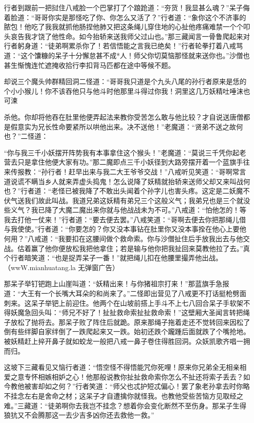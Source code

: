 \documentclass[12pt,UTF8]{ctexbook}
\begin{document}
行者到跟前一把挝住八戒脸一个巴掌打了个踉跄道：“夯货！我显甚么魂？”呆子侮着脸道：“哥哥你实是那怪吃了你、你怎么又活了？”行者道：“象你这个不济事的脓包！他吃了我我就抓他肠捏他肺又把这条绳儿穿住地的心扯他疼痛难禁一个个叩头哀告我才饶了他性命。如今抬轿来送我师父过山也。”那三藏闻言一骨鲁爬起来对行者躬身道：“徒弟啊累杀你了！若信悟能之言我已绝矣！”行者轮拳打着八戒骂道：“这个馕糠的呆子十分懈怠甚不成*人！师父你切莫恼那怪就来送你也。”沙僧也甚生惭愧连忙遮掩收拾行李扣背马匹都在途中等候不题。

却说三个魔头帅群精回洞二怪道：“哥哥我只道是个九头八尾的孙行者原来是恁的个小小猴儿！你不该吞他只与他斗时他那里斗得过你我！洞里这几万妖精吐唾沫也可湅{杀他。你却将他吞在肚里他便弄起法来教你受苦怎么敢与他比较？才自说送唐僧都是假意实为兄长性命要紧所以哄他出来。决不送他！”老魔道：“贤弟不送之故何也？”二怪道：
	
	“你与我三千小妖摆开阵势我有本事拿住这个猴头！”老魔道：“莫说三千凭你起老营去只是拿住他便大家有功。”那二魔即点三千小妖径到大路旁摆开着一个蓝旗手往来传报教：“孙行者！赶早出来与我二大王爷爷交战！”八戒听见笑道：“哥啊常言道说谎不瞒当乡人就来弄虚头捣鬼！怎么说降了妖精就抬轿来送师父却又来叫战何也？”行者道：“老怪已被我降了不敢出头闻着个孙字儿也害头疼。这定是二妖魔不伏气送我们故此叫战。我道兄弟这妖精有弟兄三个这般义气；我弟兄也是三个就没些义气？我已降了大魔二魔出来你就与他战战未为不可。”八戒道：“怕他怎的！等我去打他一仗来！”行者道：“要去便去罢。”八戒笑道：“哥啊去便去你把那绳儿借与我使使。”行者道：“你要怎的？你又没本事钻在肚里你又没本事拴在他心上要他何用？”八戒道：“我要扣在这腰间做个救命索。你与沙僧扯住后手放我出去与他交战。估着赢了他你便放松我把他拿住；若是输与他你把我扯回来莫教他拉了去。”真个行者暗笑道：“也是捉弄呆子一番！”就把绳儿扣在他腰里撮弄他出战。（wwW.mianhuatang.la 无弹窗广告）
	
	那呆子举钉钯跑上山崖叫道：“妖精出来！与你猪祖宗打来！”那蓝旗手急报道：“大王有一个长嘴大耳朵的和尚来了。”二怪即出营见了八戒更不打话挺枪劈面刺来。这呆子举钯上前迎住。他两个在山坡前搭上手斗不上七八回合呆子手软架不得妖魔急回头叫：“师兄不好了！扯扯救命索扯扯救命索！”这壁厢大圣闻言转把绳子放松了抛将去。那呆子败了阵住后就跪。原来那绳子拖着走还不觉转回来因松了倒有些绊脚自家绊倒了一跌爬起来又一跌。始初还跌个躘踵后面就跌了个嘴抢地。被妖精赶上捽开鼻子就如蛟龙一般把八戒一鼻子卷住得胜回洞。众妖凯歌齐唱一拥而归。
	
	这坡下三藏看见又恼行者道：“悟空怪不得悟能咒你死哩！原来你兄弟全无相亲相爱之意专怀相嫉相妒之心！他那般说教你扯扯救命索你怎么不扯还将索子丢去？如今教他被害却如之何？”行者笑道：“师父也忒护短忒偏心！罢了象老孙拿去时你略不挂念左右是舍命之材；这呆子才自遭擒你就怪我。也教他受些苦恼方见取经之难。”三藏道：“徒弟啊你去我岂不挂念？想着你会变化断然不至伤身。那呆子生得狼犺又不会腾那这一去少吉多凶你还去救他一救。”
	
}
\end{document}

